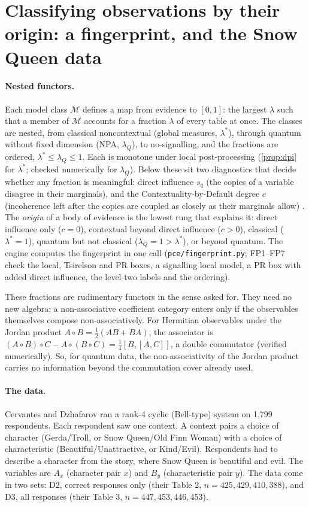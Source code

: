 \documentclass[11pt]{article}
\theoremstyle{definition}\newtheorem{definition}[theorem]{Definition}\newtheorem{remark}[theorem]{Remark}\newtheorem{example}[theorem]{Example}
\begin{document}
\section{Classifying observations by their origin: a fingerprint, and the Snow Queen data}\label{sec:origin}

\paragraph{Nested functors.}
Each model class $\mathcal M$ defines a map from evidence to $[0,1]$: the largest $\lambda$ such that a member of $\mathcal M$ accounts for a
fraction $\lambda$ of every table at once. The classes are nested, from classical noncontextual (global measures, $\lambda^*$), through
quantum without fixed dimension (NPA, $\lambda_Q$), to no-signalling, and the fractions are ordered, $\lambda^*\le\lambda_Q\le1$. Each is
monotone under local post-processing (\cref{prop:dpi} for $\lambda^*$; checked numerically for $\lambda_Q$). Below these sit two diagnostics
that decide whether any fraction is meaningful: direct influence $s_q$ (the copies of a variable disagree in their marginals), and the
Contextuality-by-Default degree $c$ (incoherence left after the copies are coupled as closely as their marginals allow)
\cite{DzhafarovKujala2016,KujalaDzhafarov2016}. The \emph{origin} of a body of evidence is the lowest rung that explains it: direct influence
only ($c=0$), contextual beyond direct influence ($c>0$), classical ($\lambda^*=1$), quantum but not classical ($\lambda_Q=1>\lambda^*$), or beyond
quantum. The engine computes the fingerprint in one call (\texttt{pce/fingerprint.py}; FP1--FP7 check the local, Tsirelson and PR boxes, a
signalling local model, a PR box with added direct influence, the level-two labels and the ordering).

These fractions are rudimentary functors in the sense asked for. They need no new algebra; a non-associative coefficient category enters
only if the observables themselves compose non-associatively. For Hermitian observables under the Jordan product $A\circ B=\tfrac12(AB+BA)$,
the associator is $(A\circ B)\circ C-A\circ(B\circ C)=\tfrac14[B,[A,C]]$, a double commutator (verified numerically). So, for quantum data,
the non-associativity of the Jordan product carries no information beyond the commutation cover already used.

\paragraph{The data.}
Cervantes and Dzhafarov \cite{CervantesDzhafarov2018} ran a rank-4 cyclic (Bell-type) system on 1{,}799 respondents. Each respondent saw one
context. A context pairs a choice of character (Gerda/Troll, or Snow Queen/Old Finn Woman) with a choice of characteristic
(Beautiful/Unattractive, or Kind/Evil). Respondents had to describe a character from the story, where Snow Queen is beautiful and evil.
The variables are $A_x$ (character pair $x$) and $B_y$ (characteristic pair $y$). The data come in two sets: D2, correct responses only (their
Table 2, $n=425,429,410,388$), and D3, all responses (their Table 3, $n=447,453,446,453$).
\end{document}
